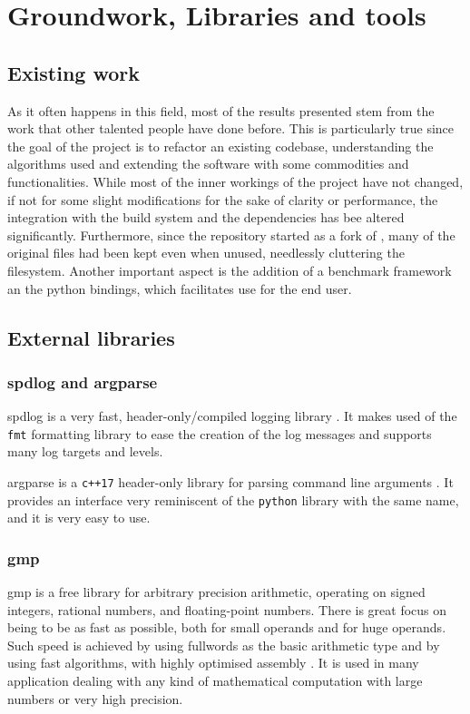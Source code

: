 \chapter{Groundwork, Libraries and tools}

\section{Existing work}

As it often happens in this field, most of the results presented stem from the work that other talented people have done before.
This is particularly true since the goal of the project is to refactor an existing codebase, understanding the algorithms used and extending the software with some commodities and functionalities.
While most of the inner workings of the project have not changed, if not for some slight modifications for the sake of clarity or performance, the integration with the build system and the dependencies has bee altered significantly.
Furthermore, since the repository started as a fork of \dreal \cite{repo:dreal}, many of the original files had been kept even when unused, needlessly cluttering the filesystem.
Another important aspect is the addition of a benchmark framework an the python bindings, which facilitates use for the end user.

\section{External libraries}

\subsection*{spdlog and argparse}

spdlog is a very fast, header-only/compiled logging library \cite{repo:spdlog}.
It makes used of the \texttt{fmt} formatting library to ease the creation of the log messages and supports many log targets and levels.

argparse is a \texttt{c++17} header-only library for parsing command line arguments \cite{repo:argparse}.
It provides an interface very reminiscent of the \texttt{python} library with the same name, and it is very easy to use.

\subsection*{gmp}

gmp is a free library for arbitrary precision arithmetic, operating on signed integers, rational numbers, and floating-point numbers.
There is great focus on being to be as fast as possible, both for small operands and for huge operands.
Such speed is achieved by using fullwords as the basic arithmetic type and by using fast algorithms, with highly optimised assembly \cite{man:gmp}.
It is used in many application dealing with any kind of mathematical computation with large numbers or very high precision.

